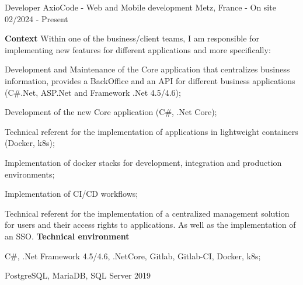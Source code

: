 

\begin{cventries}

  \cventry
    {Developer} %
    {AxioCode - Web and Mobile development} %
    {Metz, France - On site} %
    {02/2024 - Present} %
    {
      \textbf{Context}
      \newline
      Within one of the business/client teams, I am responsible for implementing new features for different applications and more specifically:
      \newline \vspace{12pt}
      \begin{cvitems} %
        \item {Development and Maintenance of the Core application that centralizes business information, provides a BackOffice and an API for different business applications (C\#.Net, ASP.Net and Framework .Net 4.5/4.6);}
        \item {Development of the new Core application (C\#, .Net Core);}
        \item {Technical referent for the implementation of applications in lightweight containers (Docker, k8s);}
        \item {Implementation of docker stacks for development, integration and production environments;}
        \item {Implementation of CI/CD workflows;}
      \end{cvitems}
      Technical referent for the implementation of a centralized management solution for users and their access rights to applications. As well as the implementation of an SSO. 
      \newline \vspace{4pt}
      \textbf{Technical environment}
      \newline \vspace{12pt}
      \begin{cvitems}
        \item {C\#, .Net Framework 4.5/4.6, .NetCore, Gitlab, Gitlab-CI, Docker, k8s;}
        \item {PostgreSQL, MariaDB, SQL Server 2019}
      \end{cvitems}
    }


\end{cventries}
